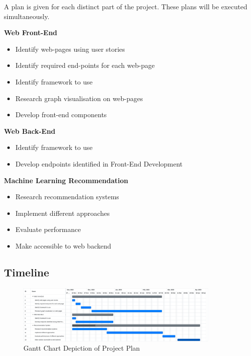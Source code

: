A plan is given for each distinct part of the project. These plans will be executed simultaneously.


\textbf{Web Front-End}
\begin{itemize}
    \item Identify web-pages using user stories
    \item Identify required end-points for each web-page
    \item Identify framework to use
    \item Research graph visualisation on web-pages
    \item Develop front-end components
\end{itemize}
\textbf{Web Back-End}
\begin{itemize}
    \item Identify framework to use
    \item Develop endpoints identified in Front-End Development
\end{itemize}
\textbf{Machine Learning Recommendation}
\begin{itemize}
    \item Research recommendation systems
    \item Implement different approaches
    \item Evaluate performance
    \item Make accessible to web backend
\end{itemize}

\subsection{Timeline}


\begin{figure}[htbp]	
	\centerline{
		\includegraphics[width=10cm]{../PlanGantt.png}
	}
	\caption{Gantt Chart Depiction of Project Plan}
\end{figure}



